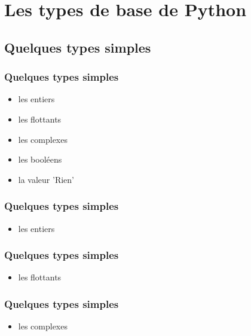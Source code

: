 \section{Les types de base de Python}
\subsection{Quelques types simples}

\begin{frame}
  \frametitle{Quelques types simples}
  \begin{itemize}
    \item<1-> les entiers
    \item<2-> les flottants
    \item<3-> les complexes
    \item<4-> les booléens
    \item<5-> la valeur 'Rien'
  \end{itemize}
\end{frame}

\begin{frame}[fragile]
  \frametitle{Quelques types simples}
  \begin{itemize}
    \item les entiers
  \end{itemize}
\begin{ipython}
\end{ipython}
\end{frame}

\begin{frame}[fragile]
  \frametitle{Quelques types simples}
  \begin{itemize}
    \item les flottants
  \end{itemize}
\begin{ipython}
\end{ipython}
\end{frame}

\begin{frame}[fragile]
  \frametitle{Quelques types simples}
  \begin{itemize}
    \item les complexes
  \end{itemize}
\begin{ipython}
\end{ipython}
\end{frame}

